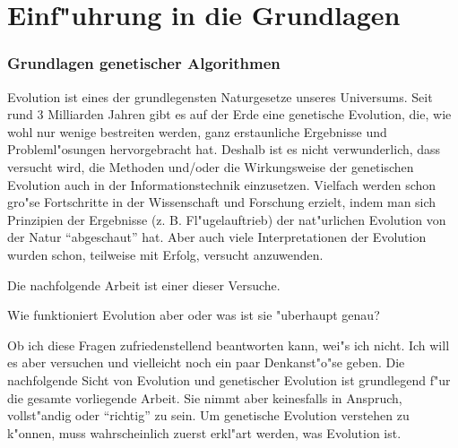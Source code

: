 %
%
%
%

\graphicspath{{./material_grundlagen/}}
\graphicspath{{./material_grundlagen/}{../material_grundlagen}}

\newpage
\part{Einf"uhrung in die Grundlagen}
\label{partIntroductionBasics}



\section{Grundlagen genetischer Algorithmen}

Evolution ist eines der grundlegensten Naturgesetze unseres Universums. Seit rund 3 Milliarden Jahren gibt es auf der Erde eine genetische Evolution, die, wie wohl nur wenige bestreiten werden, ganz erstaunliche Ergebnisse und Probleml"osungen hervorgebracht hat. Deshalb ist es nicht verwunderlich, dass versucht wird, die Methoden und/oder die Wirkungsweise der genetischen Evolution auch in der Informationstechnik einzusetzen. Vielfach werden schon gro"se Fortschritte in der Wissenschaft und Forschung erzielt, indem man sich Prinzipien der Ergebnisse (z. B. Fl"ugelauftrieb) der nat"urlichen Evolution von der Natur ``abgeschaut'' hat. Aber auch viele Interpretationen der Evolution wurden schon, teilweise mit Erfolg, versucht anzuwenden.

Die nachfolgende Arbeit ist einer dieser Versuche.

Wie funktioniert Evolution aber oder was ist sie "uberhaupt genau?

Ob ich diese Fragen zufriedenstellend beantworten kann, wei"s ich nicht. Ich will es aber versuchen und vielleicht noch ein paar Denkanst"o"se geben. Die nachfolgende Sicht von Evolution und genetischer Evolution ist grundlegend f"ur die gesamte vorliegende Arbeit. Sie nimmt aber keinesfalls in Anspruch, vollst"andig oder ``richtig'' zu sein. Um genetische Evolution verstehen zu k"onnen, muss wahrscheinlich zuerst erkl"art werden, was Evolution ist.


